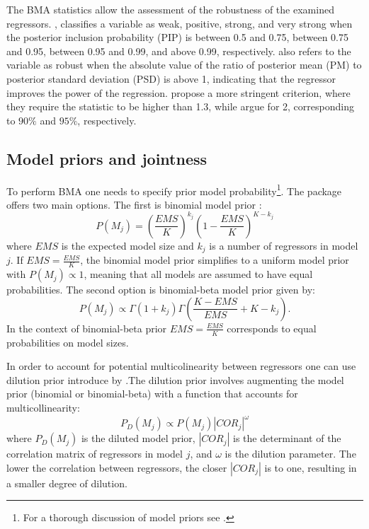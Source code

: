 \documentclass[a4paper]{article}
\begin{document}
\indent The BMA statistics allow the assessment of the robustness of the examined regressors.
\citet{Raftery+1995}, classifies a variable as weak, positive, strong, and very strong when the posterior inclusion probability (PIP) is between 0.5 and 0.75, between 0.75 and 0.95, between 0.95 and 0.99, and above 0.99, respectively.
\citet{Raftery+1995} also refers to the variable as robust when the absolute value of the ratio of posterior mean (PM) to posterior standard deviation (PSD) is above 1, indicating that the regressor improves the power of the regression.
\citet{Masanjala+2008} propose a more stringent criterion, where they require the statistic to be higher than 1.3, while \citet{Sala+2004} argue for 2, corresponding to $90\%$ and $95\%$, respectively.

\subsection{Model priors and jointness}\label{prior_joint}
\noindent To perform BMA one needs to specify prior model probability\footnote{For a thorough discussion of model priors see \citet{Sala+2004,Ley+2009,George+2010,Eicher+2011}.}.
The package offers two main options.
The first is binomial model prior \citep{Sala+2004}:
\begin{equation}
    P(M_{j})=(\frac{EMS}{K})^{k_{j}}(1-\frac{EMS}{K})^{K-k_{j}}
\end{equation}
where $EMS$ is the expected model size and $k_{j}$ is a number of regressors in model $j$.
If $EMS = \frac{EMS}{K}$, the binomial model prior simplifies to a uniform model prior with $P(M_{j}) \propto 1$, meaning that all models are assumed to have equal probabilities.
The second option is binomial-beta model prior \citet{Ley+2009} given by:
\begin{equation}
    P(M_{j}) \propto \Gamma(1+k_{j})\Gamma(\frac{K-EMS}{EMS}+K-k_{j}).
\end{equation}
In the context of binomial-beta prior $EMS = \frac{EMS}{K}$ corresponds to equal probabilities on model sizes.

\indent In order to account for potential multicolinearity between regressors one can use dilution prior introduce by \citet{George+2010}.The dilution prior involves augmenting the model prior (binomial or binomial-beta) with a function that accounts for multicollinearity:
\begin{equation}
    P_{D}(M_{j}) \propto P(M_{j})|COR_{j}|^{\omega}
\end{equation}
where $P_{D}(M_{j})$ is the diluted model prior, $|COR_{j}|$ is the determinant of the correlation matrix of regressors in model $j$, and $\omega$ is the dilution parameter.
The lower the correlation between regressors, the closer $|COR_{j}|$ is to one, resulting in a smaller degree of dilution.
\end{document}
